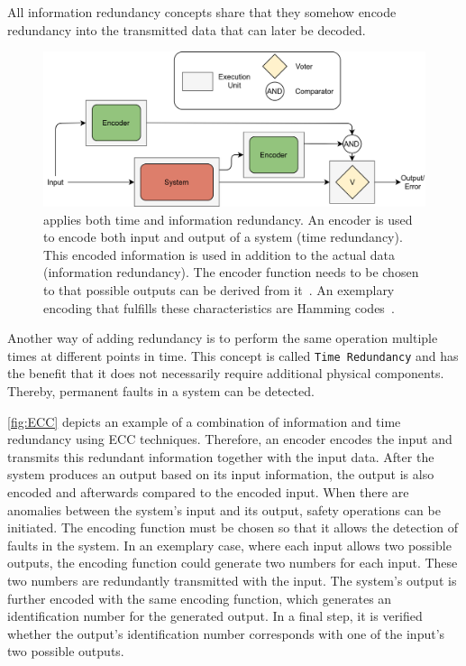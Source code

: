 All information redundancy concepts share that they somehow encode redundancy into the transmitted data that can later be decoded.

\begin{figure}[!hb]
	\centering
	\includegraphics[width=0.75\linewidth]{images/ECC}
	\caption{ applies both time and information redundancy. An encoder is used to encode both input and output of a system (time redundancy). This encoded information is used in addition to the actual data (information redundancy). The encoder function needs to be chosen to that possible outputs can be derived from it~\cite{Su2005ECC}. An exemplary encoding that fulfills these characteristics are Hamming codes~\cite{HammingCodes}.}
	\label{fig:ECC}
\end{figure}

Another way of adding redundancy is to perform the same operation multiple times at different points in time.
This concept is called \texttt{Time Redundancy} and has the benefit that it does not necessarily require additional physical components.
Thereby, permanent faults in a system can be detected.

\autoref{fig:ECC} depicts an example of a combination of information and time redundancy using \gls*{ECC} techniques.
Therefore, an encoder encodes the input and transmits this redundant information together with the input data.
After the system produces an output based on its input information, the output is also encoded and afterwards compared to the encoded input.
When there are anomalies between the system's input and its output, safety operations can be initiated.
The encoding function must be chosen so that it allows the detection of faults in the system.
In an exemplary case, where each input allows two possible outputs, the encoding function could generate two numbers for each input.
These two numbers are redundantly transmitted with the input.
The system's output is further encoded with the same encoding function, which generates an identification number for the generated output.
In a final step, it is verified whether the output's identification number corresponds with one of the input's two possible outputs.

